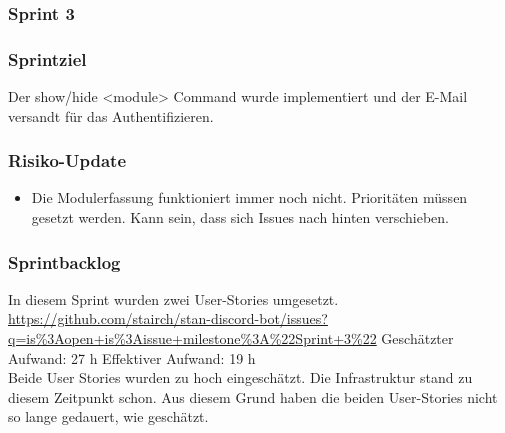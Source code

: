 \documentclass[a4paper, table]{article}
\begin{document}
\subsubsection{Sprint 3}
\subsubsection*{Sprintziel}
Der show/hide <module> Command wurde implementiert und der E-Mail versandt für das Authentifizieren.

\subsubsection*{Risiko-Update}
\begin{itemize}
    \item Die Modulerfassung funktioniert immer noch nicht.
    Prioritäten müssen gesetzt werden.
    Kann sein, dass sich Issues nach hinten verschieben.
\end{itemize}

\subsubsection*{Sprintbacklog}
In diesem Sprint wurden zwei User-Stories umgesetzt.\\
\url{https://github.com/stairch/stan-discord-bot/issues?q=is%3Aopen+is%3Aissue+milestone%3A%22Sprint+3%22}
\newline
Geschätzter Aufwand: 27 h
\newline
Effektiver Aufwand: 19 h\\
Beide User Stories wurden zu hoch eingeschätzt. 
Die Infrastruktur stand zu diesem Zeitpunkt schon.
Aus diesem Grund haben die beiden User-Stories nicht so lange gedauert, wie geschätzt.
\end{document}
